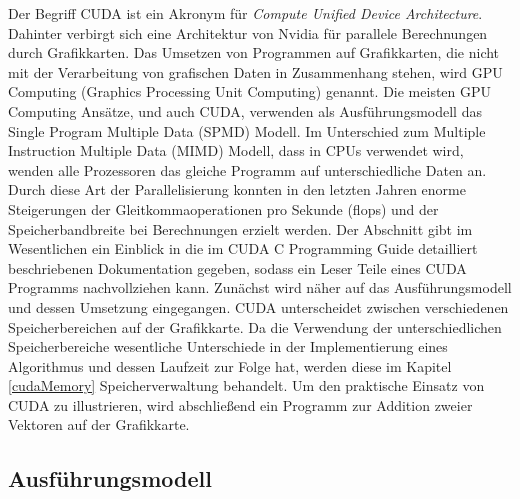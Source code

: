 Der Begriff CUDA ist ein Akronym für \textit{Compute Unified Device Architecture}. Dahinter verbirgt sich eine Architektur von Nvidia für parallele Berechnungen durch Grafikkarten. Das Umsetzen von Programmen auf Grafikkarten, die nicht mit der Verarbeitung von grafischen Daten in Zusammenhang stehen, wird GPU Computing (Graphics Processing Unit Computing) genannt. Die meisten GPU Computing Ansätze, und auch CUDA, verwenden als Ausführungsmodell das Single Program Multiple Data (SPMD) Modell. Im Unterschied zum Multiple Instruction Multiple Data (MIMD) Modell, dass in CPUs verwendet wird, wenden alle Prozessoren das gleiche Programm auf unterschiedliche Daten an. Durch diese Art der Parallelisierung konnten in den letzten Jahren enorme Steigerungen der Gleitkommaoperationen pro Sekunde (flops) und der Speicherbandbreite bei Berechnungen erzielt werden.\newline
Der Abschnitt gibt im Wesentlichen ein Einblick in die im CUDA C Programming Guide \cite{cud2012} detailliert beschriebenen Dokumentation gegeben, sodass ein Leser Teile eines CUDA Programms nachvollziehen kann. Zunächst wird näher auf das Ausführungsmodell und dessen Umsetzung eingegangen. CUDA unterscheidet zwischen verschiedenen Speicherbereichen auf der Grafikkarte. Da die Verwendung der unterschiedlichen Speicherbereiche wesentliche Unterschiede in der Implementierung eines Algorithmus und dessen Laufzeit zur Folge hat, werden diese im Kapitel \ref{cudaMemory} Speicherverwaltung behandelt. Um den praktische Einsatz von CUDA zu illustrieren, wird abschließend ein Programm zur Addition zweier Vektoren auf der Grafikkarte.

\subsection{Ausführungsmodell}

